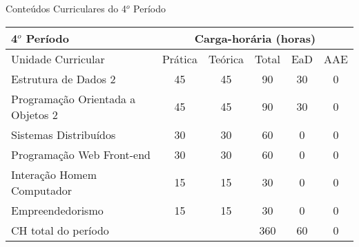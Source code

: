 \begin{quadro}[ht!]
\centering
\caption{Conteúdos Curriculares do 4$^o$ Período}\label{qua:periodo4}
\begin{tabular}{|p{5.0cm}|c|c|c|c|c|}
\hline
\rowcolor{blue1} 4$^o$ Período & \multicolumn{5}{|c|}{\centering Carga-horária (horas)} \\ \hline
\rowcolor{blue1} Unidade Curricular & Prática & Teórica & Total & EaD & AAE \\ \hline
Estrutura de Dados 2 & 45 & 45 & 90 & 30	&	0 \\	\hline
Programação Orientada a Objetos 2 & 45 & 45 & 90 & 30	&	0 \\	\hline
Sistemas Distribuídos & 30 & 30 & 60 & 0	&	0 \\	\hline
Programação Web Front-end & 30 & 30 & 60 & 0	&	0 \\	\hline
Interação Homem Computador & 15 & 15 & 30 & 0	&	0 \\	\hline
Empreendedorismo & 15 & 15 & 30 & 0	&	0 \\	\hline
CH total do período & \multicolumn{2}{p{3.3cm}|}{\cellcolor{blue1}} & 360 & 60	&	0 \\ \hline
\end{tabular} \end{quadro}